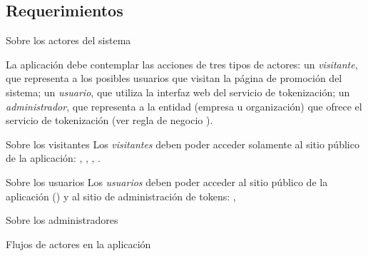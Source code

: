 %
%

\subsection{Requerimientos}


{Sobre los actores del sistema}
{
  La aplicación debe contemplar las acciones de tres tipos de actores: un
  \textit{visitante}, que representa a los posibles usuarios que visitan la
  página de promoción del sistema; un \textit{usuario}, que utiliza la interfaz
  web del servicio de tokenización; un \textit{administrador}, que representa a
  la entidad (empresa u organización) que ofrece el servicio de tokenización
  (ver regla de negocio ).

  {Sobre los visitantes}
  {
    Los \textit{visitantes} deben poder acceder solamente al sitio público de la
    aplicación: , ,
    , .
  }

  {Sobre los usuarios}
  {
    Los \textit{usuarios} deben poder acceder al sitio público de la aplicación
    () y al sitio de administración de tokens:
    , \textit{}
  }

  {Sobre los administradores}
  {

  }

  {Flujos de actores en la aplicación}
  {

  }
}

